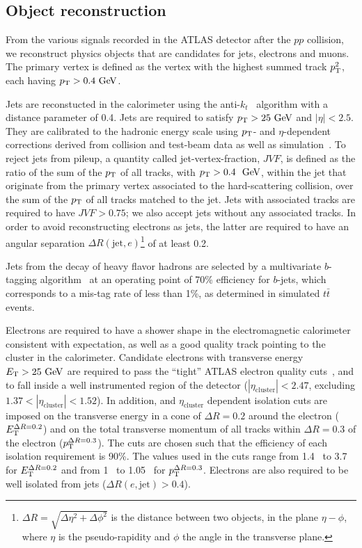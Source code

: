\subsection{Object reconstruction}\label{sect:objects}
From the various signals recorded in the ATLAS detector after the $pp$ collision, we reconstruct
physics objects that are candidates for jets, electrons and muons. The primary vertex is defined
as the vertex with the highest summed track $p_{\mathrm{T}}^2$, each having $\pT>0.4 \GeV{}$.

Jets are reconstucted in the calorimeter using the anti-$k_t$~\cite{Cacciari:2008gp} algorithm with
a distance parameter of 0.4. Jets are required to satisfy $\pt>25 \GeV$ and $|\eta|<2.5$. They are
calibrated to the hadronic energy scale using $p_{\mathrm{T}}$- and $\eta$-dependent corrections derived from
collision and test-beam data as well as simulation~\cite{Aad:2011he}. To reject jets from pileup, 
a quantity called jet-vertex-fraction, $JVF$, is defined as the ratio of the sum
of the $p_{\mathrm{T}}$ of all tracks, with $\pt>0.4~\GeV{}$, within the jet that originate from the primary 
vertex associated to the hard-scattering collision, over the sum of the $p_{\mathrm{T}}$ of all tracks 
matched to the jet. Jets with associated tracks are required to have $JVF>0.75$; we also
accept jets without any associated tracks. In order to avoid reconstructing electrons as jets,
the latter are required to have an angular separation 
$\Delta R(\mathrm{jet},e)$\footnote{$\Delta R=\sqrt{\Delta\eta^2+\Delta\phi^2}$ is the distance 
between two objects, in
the plane $\eta-\phi$, where $\eta$ is the pseudo-rapidity and $\phi$ the angle in the transverse
plane.} of at least 0.2.

Jets from the decay of heavy flavor hadrons are selected by a multivariate $b$-tagging 
algorithm~\cite{ATLAS-CONF-2012-043} at an operating point of 70\% efficiency for $b$-jets, which
corresponds to a
mis-tag rate of less than 1\%, as determined in simulated $t\bar{t}$ events.

Electrons are required to have a shower shape in the electromagnetic calorimeter consistent with
expectation, as well as a good quality track pointing to the cluster in the calorimeter.
Candidate electrons with transverse energy $\ET>25 \GeV$ are required to pass the ``tight''
ATLAS electron quality cuts~\cite{Aad:2011mk}, and to fall inside a well instrumented region
of the detector ($|\eta_\mathrm{cluster}|<2.47$, excluding $1.37<|\eta_\mathrm{cluster}|<1.52$). 
In addition, \ET{} and $\eta_\mathrm{cluster}$ dependent isolation cuts are imposed on the transverse 
energy in a cone of $\Delta R = 0.2$ around the electron ($E_{\mathrm{T}}^{\Delta R=0.2}$) and on the total 
transverse momentum of all tracks within $\Delta R = 0.3$ of the electron ($p_{\mathrm{T}}^{\Delta R=0.3}$).
The cuts are chosen such that the efficiency of each isolation requirement is 90\%. The values used
in the cuts range from 1.4~\GeV{} to 3.7~\GeV{} for $E_{\mathrm{T}}^{\Delta R=0.2}$ and from 1~\GeV{} to 1.05~\GeV{}
for $p_{\mathrm{T}}^{\Delta R=0.3}$. Electrons are also required to be well 
isolated from jets ($\Delta R(e,\mathrm{jet})>0.4$).

